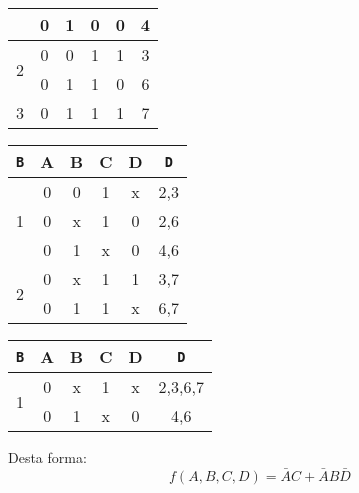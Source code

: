 \documentclass{article}
\begin{document}
\begin{resolution}
\begin{table}[H]
\begin{tabular}{c cccc c}
                                               & 0 & 1 & 0 & 0 & 4\\\hline
                            \multirow{2}{*}{2} & 0 & 0 & 1 & 1 & 3\\
                                               & 0 & 1 & 1 & 0 & 6\\\hline
                            3                  & 0 & 1 & 1 & 1 & 7\\\hline
                        \end{tabular}
                        \qquad
                        \centering\begin{tabular}{c cccc c}
                            \texttt{B}         & A & B & C & D & \texttt{D}\\\hline
                            \multirow{3}{*}{1} & 0 & 0 & 1 & x & 2,3\\
                                               & 0 & x & 1 & 0 & 2,6\\
                                               & 0 & 1 & x & 0 & 4,6\\\hline
                            \multirow{2}{*}{2} & 0 & x & 1 & 1 & 3,7\\
                                               & 0 & 1 & 1 & x & 6,7\\\hline
                        \end{tabular}
                        \qquad
                        \centering\begin{tabular}{c cccc c}
                            \texttt{B}         & A & B & C & D & \texttt{D}\\\hline
                            \multirow{2}{*}{1} & 0 & x & 1 & x & 2,3,6,7\\
                                               & 0 & 1 & x & 0 & 4,6\\\hline
                        \end{tabular}
                    \end{table}\noindent
                Desta forma:
                    \begin{equation}
                        \boxed{f(A,B,C,D) = \bar{A}C + \bar{A}B\bar{D}}
                    \end{equation}
            \end{resolution}
\end{document}
